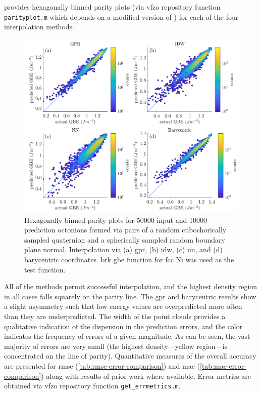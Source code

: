 \documentclass[final,twocolumn,12pt]{elsarticle}
\newcommand{\inpt}{input}
\newcommand{\outpt}{prediction}
\newcommand{\vfzorepo}{\gls{vfzo} repository}
\begin{document}
{ provides hexagonally binned parity plots (via \vfzorepo{} function \texttt{parityplot.m} which depends on a modified version of \cite{beanHexscatter2020}) for each of the four interpolation methods.
\begin{figure}
    \centering
    \includegraphics[scale=1]{brkparity50000.png}
    \caption{Hexagonally binned parity plots for \num{50000} \inpt{} and \num{10000} \outpt{} octonions formed via pairs of a random cubochorically sampled quaternion and a spherically sampled random boundary plane normal. Interpolation via (a) \gls{gpr}, (b) \gls{idw}, (c) \gls{nn}, and (d) barycentric coordinates.  \gls{brk} \gls{gbe} function for \gls{fcc} Ni \cite{bulatovGrainBoundaryEnergy2014} was used as the test function.}
    \label{fig:brkparity50000}
\end{figure}

All of the methods permit successful interpolation, and the highest density region in all cases falls squarely on the parity line. The \gls{gpr} and barycentric results show a slight asymmetry such that low energy values are overpredicted more often than they are underpredicted. The width of the point clouds provides a qualitative indication of the dispersion in the prediction errors, and the color indicates the frequency of errors of a given magnitude. As can be seen, the vast majority of errors are very small (the highest density---yellow region---is concentrated on the line of parity). Quantitative measures of the overall accuracy are presented for \gls{rmse} (\cref{tab:rmse-error-comparison}) and \gls{mae} (\cref{tab:mae-error-comparison}) along with results of prior work where available. Error metrics are obtained via \vfzorepo{} function \texttt{get\_errmetrics.m}.

}
\end{document}
